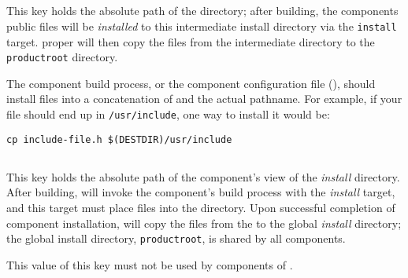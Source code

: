 
\subsection{}\label{variables:destdir-directory}

This key holds the absolute path of the \destdir directory; after
building, the components public files will be \emph{installed} to this
intermediate install directory via the \texttt{install} target.
\lmsbw proper will then copy the files from the intermediate directory
to the \texttt{productroot} directory.

The component build process, or the component configuration file
(), should install files into a concatenation of
\destdir and the actual pathname.  For example, if your file should
end up in \texttt{/usr/include}, one way to install it would be:

\begin{verbatim}
cp include-file.h $(DESTDIR)/usr/include
\end{verbatim}


\subsection{}\label{variables:install-directory}

This key holds the absolute path of the component's view of the
\emph{install} directory.  After building, \lmsbw will invoke the
component's build process with the \emph{install} target, and this
target must place files into the \destdir directory.  Upon successful
completion of component installation, \lmsbw will copy the files from
the \destdir to the global \emph{install} directory; the global
install directory, \texttt{productroot}, is shared by all components.

This value of this key must not be used by components of \lmsbw.


\subsection{}\label{variables:install-target}

